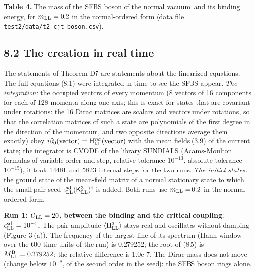 \documentclass[
  10pt,
]{article}
\begin{document}
\textbf{Table 4.} The mass of the SFBS boson of the normal vacuum, and
its binding energy, for \(m_{\rm LL}=0.2\) in the normal-ordered form
(data file \texttt{test2/data/t2\_cjt\_boson.csv}).

\hypertarget{the-creation-in-real-time}{%
\subsection{8.2 The creation in real
time}\label{the-creation-in-real-time}}

The statements of Theorem D7 are statements about the linearized
equations. The full equations (8.1) were integrated in time to see the
SFBS appear. \emph{The integration:} the occupied vectors of every
momentum (8 vectors of 16 components for each of 128 momenta along one
axis; this is exact for states that are covariant under rotations: the
16 Dirac matrices are scalars and vectors under rotations, so that the
correlation matrices of such a state are polynomials of the first degree
in the direction of the momentum, and two opposite directions average
them exactly) obey
\(i\partial_0(\text{vector})=\mathsf H^{\rm var}_{\rm LL}(\text{vector})\)
with the mean fields (3.9) of the current state; the integrator is CVODE
of the library SUNDIALS (Adams-Moulton formulas of variable order and
step, relative tolerance \(10^{-13}\), absolute tolerance \(10^{-15}\));
it took 14481 and 5823 internal steps for the two runs. \emph{The
initial states:} the ground state of the mean-field matrix of a normal
stationary state to which the small pair seed
\(\epsilon^{\rm sd}_{\rm LL}(\mathsf K^3_{\rm LL})^\dagger\) is added.
Both runs use \(m_{\rm LL}=0.2\) in the normal-ordered form.

\textbf{Run 1: \(G_{\rm LL}=20\), between the binding and the critical
coupling; \(\epsilon^{\rm sd}_{\rm LL}=10^{-4}\).} The pair amplitude
\(\langle\Pi^3_{\rm LL}\rangle\) stays real and oscillates without
damping (Figure 3 (a)). The frequency of the largest line of its
spectrum (Hann window over the 600 time units of the run) is 0.279252;
the root of (8.5) is \(M^{\rm B}_{\rm LL}=0.279252\); the relative
difference is 1.0e-7. The Dirac mass does not move (change below
\(10^{-8}\), of the second order in the seed): the SFBS boson rings
alone.
\end{document}
